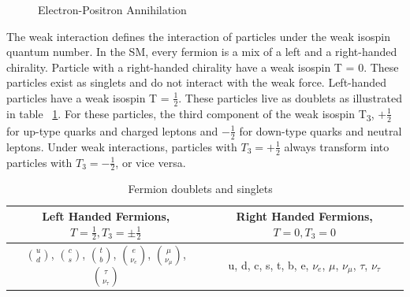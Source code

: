 \begin{figure}[h]
\begin{center}
\caption[Electron-Positron Annihilation]{Electron-Positron Annihilation}
\label{Fey:e-p}
\end{center}
\end{figure}

\indent The weak interaction defines the interaction of particles under the weak isospin quantum number. In the SM, every fermion is a mix of a left and a right-handed chirality. Particle with a right-handed chirality have a weak isospin T = 0. These particles exist as singlets and do not interact with the weak force. Left-handed particles have a weak isospin T =  ${\frac{1}{2}}$. These particles live as doublets as illustrated in table ~\ref{tab:chiral}. For these particles, the third component of the weak isospin T\textsubscript{3}, ${+\frac{1}{2}}$ for up-type quarks and charged leptons and ${-\frac{1}{2}}$ for down-type quarks and neutral leptons. Under weak interactions, particles with ${T_{3} = +\frac{1}{2}}$ always transform into particles with ${T_{3} = -\frac{1}{2}}$, or vice versa.\newline

\begin{table}[h]
\begin{center}
\def\arraystretch{1.5}
\begin{tabular}[h]{|c|c|}
\hline
Left Handed Fermions, ${T = \frac{1}{2}, T_{3} = \pm\frac{1}{2}}$ & Right Handed Fermions, ${T = 0, T_{3} = 0}$\\
\hline\hline
${\binom{u}{d}}$, ${\binom{c}{s}}$, ${\binom{t}{b}}$, ${\binom{e}{\nu_{e}}}$, ${\binom{\mu}{\nu_{\mu}}}$, ${\binom{\tau}{\nu_{\tau}}}$ & u, d, c, s, t, b, e, ${\nu_{e}}$, ${\mu}$, ${\nu_{\mu}}$, ${\tau}$, ${\nu_{\tau}}$ \\
\hline
\end{tabular}
\caption[Fermion doublets and singlets]{Fermion doublets and singlets ~\cite{Ian:2018}}
\label{tab:chiral}
\end{center}
\end{table}


